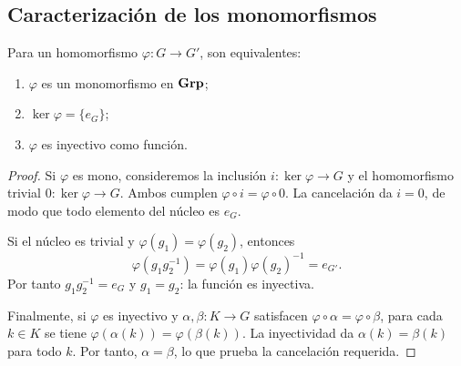 \subsection{Caracterización de los monomorfismos}\label{tema:4-3-2}
\begin{prop}\label{prop:C4-mono}
Para un homomorfismo $\varphi:G\to G'$, son equivalentes:
\begin{enumerate}[label=\textup{(\alph*)}]
\item $\varphi$ es un monomorfismo en $\mathbf{Grp}$;
\item $\ker\varphi=\{e_G\}$;
\item $\varphi$ es inyectivo como función.
\end{enumerate}
\end{prop}
\begin{proof}
Si $\varphi$ es mono, consideremos la inclusión $i:\ker\varphi\to G$ y el homomorfismo trivial $0:\ker\varphi\to G$. Ambos cumplen $\varphi\circ i=\varphi\circ0$. La cancelación da $i=0$, de modo que todo elemento del núcleo es $e_G$.

Si el núcleo es trivial y $\varphi(g_1)=\varphi(g_2)$, entonces
\[
\varphi(g_1g_2^{-1})=\varphi(g_1)\varphi(g_2)^{-1}=e_{G'}.
\]
Por tanto $g_1g_2^{-1}=e_G$ y $g_1=g_2$: la función es inyectiva.

Finalmente, si $\varphi$ es inyectivo y $\alpha,\beta:K\to G$ satisfacen $\varphi\circ\alpha=\varphi\circ\beta$, para cada $k\in K$ se tiene $\varphi(\alpha(k))=\varphi(\beta(k))$. La inyectividad da $\alpha(k)=\beta(k)$ para todo $k$. Por tanto, $\alpha=\beta$, lo que prueba la cancelación requerida.
\end{proof}
